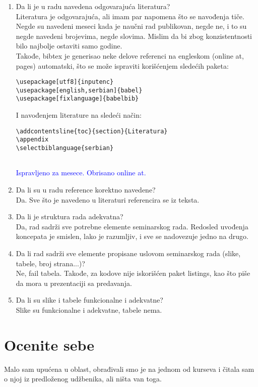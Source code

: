 \documentclass[a4paper]{report}
\newcommand{\odgovor}[1]{\textcolor{blue}{#1}}
\begin{document}
\begin{enumerate}
\item Da li je u radu navedena odgovarajuća literatura?\\
Literatura je odgovarajuća, ali imam par napomena što se navođenja tiče.\\
Negde su navedeni meseci kada je naučni rad publikovan, negde ne, i to su negde navedeni brojevima, negde slovima. Mislim da bi zbog konzistentnosti bilo najbolje ostaviti samo godine.\\
Takođe, bibtex je generisao neke delove referenci na engleskom (online at, pages) automatski, što se može ispraviti korišćenjem sledećih paketa:

\begin{verbatim}
\usepackage[utf8]{inputenc}
\usepackage[english,serbian]{babel}
\usepackage[fixlanguage]{babelbib}
\end{verbatim}

I navođenjem literature na sledeći način:

\begin{verbatim}
\addcontentsline{toc}{section}{Literatura}
\appendix
\selectbiblanguage{serbian}


\end{verbatim}


\odgovor{Ispravljeno za mesece. Obrisano online at.}

\item Da li su u radu reference korektno navedene?\\
Da. Sve što je navedeno u literaturi referencira se iz teksta.

\item Da li je struktura rada adekvatna?\\
Da, rad sadrži sve potrebne elemente seminarskog rada. Redosled uvođenja koncepata je smislen, lako je razumljiv, i sve se nadovezuje jedno na drugo.

\item Da li rad sadrži sve elemente propisane uslovom seminarskog rada (slike, tabele, broj strana...)?\\
Ne, fail tabela. Takođe, za kodove nije iskorišćen paket listings, kao što piše da mora u prezentaciji sa predavanja.

\item Da li su slike i tabele funkcionalne i adekvatne?\\
Slike su funkcionalne i adekvatne, tabele nema.
\end{enumerate}

\section{Ocenite sebe}
Malo sam upućena u oblast, obrađivali smo je na jednom od kurseva i čitala sam o njoj iz predloženog udžbenika, ali ništa van toga.
\end{document}
